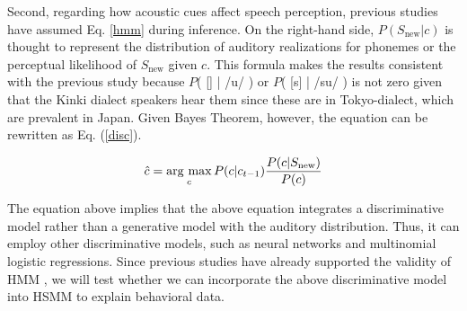 \documentclass[a4paper,11pt,twocolumn]{article}
\newcommand{\argmax}{\mathop{\rm arg~max}\limits}
\begin{document}
Second, regarding how acoustic cues affect speech perception, previous studies \cite{wilson2013bayesian, kishiyama2021influence} have assumed Eq. \ref{hmm} during inference. On the right-hand side, $P(S_{\text{new}}|c)$ is thought to represent the distribution of auditory realizations for phonemes or the perceptual likelihood of $S_{\text{new}}$ given $c$. This formula makes the results consistent with the previous study because $P$( [\textsubring{\textturnm}] | /u/ ) or $P$( [s] | /su/ ) is not zero given that the Kinki dialect speakers hear them since these are in Tokyo-dialect, which are prevalent in Japan. Given Bayes Theorem, however, the equation can be rewritten as Eq. (\ref{disc}).

\begin{equation} \label{disc}
    \hat{c} = \argmax_{c} P(c | c_{t-1}) \frac{P(c|S_{\text{new}})}{P(c)}
\end{equation}

The equation above implies that the above equation integrates a discriminative model rather than a generative model with the auditory distribution. Thus, it can employ other discriminative models, such as neural networks and multinomial logistic regressions. Since previous studies have already supported the validity of HMM \cite{kishiyama2021influence}, we will test whether we can incorporate the above discriminative model into HSMM to explain behavioral data.




\end{document}
